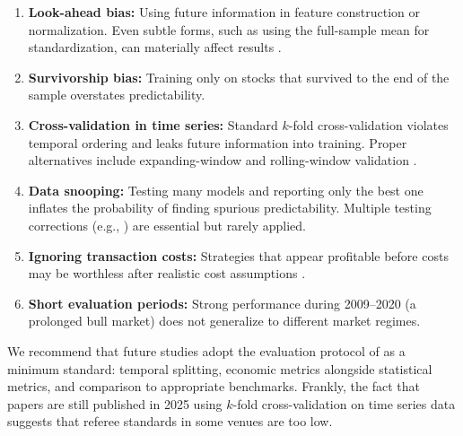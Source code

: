 \begin{enumerate}[leftmargin=*]
    \item \textbf{Look-ahead bias:} Using future information in feature construction or normalization. Even subtle forms, such as using the full-sample mean for standardization, can materially affect results \citep{DePrado2018}.

    \item \textbf{Survivorship bias:} Training only on stocks that survived to the end of the sample overstates predictability.

    \item \textbf{Cross-validation in time series:} Standard $k$-fold cross-validation violates temporal ordering and leaks future information into training. Proper alternatives include expanding-window and rolling-window validation \citep{Gu2020}.

    \item \textbf{Data snooping:} Testing many models and reporting only the best one inflates the probability of finding spurious predictability. Multiple testing corrections (e.g., \citealt{Harvey2016}) are essential but rarely applied.

    \item \textbf{Ignoring transaction costs:} Strategies that appear profitable before costs may be worthless after realistic cost assumptions \citep{NovyMarx2015alt, Tobek2021}.

    \item \textbf{Short evaluation periods:} Strong performance during 2009--2020 (a prolonged bull market) does not generalize to different market regimes.
\end{enumerate}

We recommend that future studies adopt the evaluation protocol of \citet{Gu2020} as a minimum standard: temporal splitting, economic metrics alongside statistical metrics, and comparison to appropriate benchmarks. Frankly, the fact that papers are still published in 2025 using $k$-fold cross-validation on time series data suggests that referee standards in some venues are too low.
